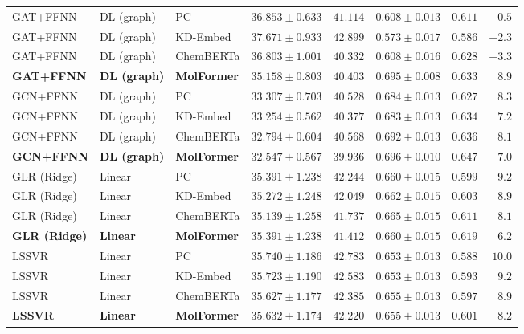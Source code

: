 \documentclass{article}
\begin{document}
\begin{table}[!ht]
{\begin{tabular}{lllccccr}
\midrule
GAT+FFNN & DL (graph) & PC & $36.853 \pm 0.633$ & $41.114$ & $0.608 \pm 0.013$ & $0.611$ & $-0.5$ \\
GAT+FFNN & DL (graph) & KD-Embed & $37.671 \pm 0.933$ & $42.899$ & $0.573 \pm 0.017$ & $0.586$ & $-2.3$ \\
GAT+FFNN & DL (graph) & ChemBERTa & $36.803 \pm 1.001$ & $40.332$ & $0.608 \pm 0.016$ & $0.628$ & $-3.3$ \\
\textbf{GAT+FFNN} & \textbf{DL (graph)} & \textbf{MolFormer} & $\mathbf{35.158 \pm 0.803}$ & $\mathbf{40.403}$ & $\mathbf{0.695 \pm 0.008}$ & $\mathbf{0.633}$ & $\mathbf{8.9}$ \\
GCN+FFNN & DL (graph) & PC & $33.307 \pm 0.703$ & $40.528$ & $0.684 \pm 0.013$ & $0.627$ & $8.3$ \\
GCN+FFNN & DL (graph) & KD-Embed & $33.254 \pm 0.562$ & $40.377$ & $0.683 \pm 0.013$ & $0.634$ & $7.2$ \\
GCN+FFNN & DL (graph) & ChemBERTa & $32.794 \pm 0.604$ & $40.568$ & $0.692 \pm 0.013$ & $0.636$ & $8.1$ \\
\textbf{GCN+FFNN} & \textbf{DL (graph)} & \textbf{MolFormer} & $\mathbf{32.547 \pm 0.567}$ & $\mathbf{39.936}$ & $\mathbf{0.696 \pm 0.010}$ & $\mathbf{0.647}$ & $\mathbf{7.0}$ \\
\midrule
GLR (Ridge) & Linear & PC & $35.391 \pm 1.238$ & $42.244$ & $0.660 \pm 0.015$ & $0.599$ & $9.2$ \\
GLR (Ridge) & Linear & KD-Embed & $35.272 \pm 1.248$ & $42.049$ & $0.662 \pm 0.015$ & $0.603$ & $8.9$ \\
GLR (Ridge) & Linear & ChemBERTa & $35.139 \pm 1.258$ & $41.737$ & $0.665 \pm 0.015$ & $0.611$ & $8.1$ \\
\textbf{GLR (Ridge)} & \textbf{Linear} & \textbf{MolFormer} & $\mathbf{35.391 \pm 1.238}$ & $\mathbf{41.412}$ & $\mathbf{0.660 \pm 0.015}$ & $\mathbf{0.619}$ & $\mathbf{6.2}$ \\
LSSVR & Linear & PC & $35.740 \pm 1.186$ & $42.783$ & $0.653 \pm 0.013$ & $0.588$ & $10.0$ \\
LSSVR & Linear & KD-Embed & $35.723 \pm 1.190$ & $42.583$ & $0.653 \pm 0.013$ & $0.593$ & $9.2$ \\
LSSVR & Linear & ChemBERTa & $35.627 \pm 1.177$ & $42.385$ & $0.655 \pm 0.013$ & $0.597$ & $8.9$ \\
\textbf{LSSVR} & \textbf{Linear} & \textbf{MolFormer} & $\mathbf{35.632 \pm 1.174}$ & $\mathbf{42.220}$ & $\mathbf{0.655 \pm 0.013}$ & $\mathbf{0.601}$ & $\mathbf{8.2}$ \\
\bottomrule
\end{tabular}
}
\end{table}
\end{document}
